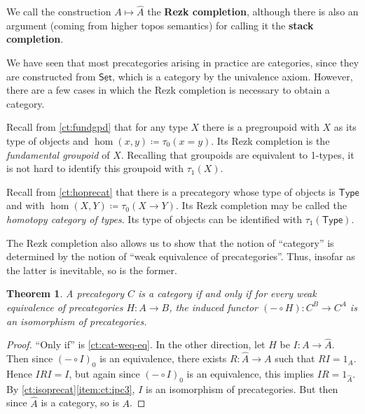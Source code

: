 \documentclass{amsart}
\newcommand{\defeq}{\coloneqq}  %
\newcommand{\type}{\ensuremath{\mathsf{Type}}\xspace}
\renewcommand{\set}{\ensuremath{\mathsf{Set}}\xspace}
\newcommand{\trunc}[2]{\tau_{#1}(#2)}
\def\pizero{\trunc0}
\newcommand{\uset}{\ensuremath{\underline{\set}}\xspace}
\newtheorem{thm}{Theorem}[section]
\theoremstyle{definition}
\theoremstyle{remark}
\numberwithin{equation}{section}
\begin{document}
We call the construction $A\mapsto \widehat A$ the \textbf{Rezk completion}, although there is also an argument (coming from higher topos semantics) for calling it the \textbf{stack completion}.

We have seen that most precategories arising in practice are categories, since they are constructed from \uset, which is a category by the univalence axiom.
However, there are a few cases in which the Rezk completion is necessary to obtain a category.

\begin{eg}
  Recall from \autoref{ct:fundgpd} that for any type $X$ there is a pregroupoid with $X$ as its type of objects and $\hom(x,y) \defeq \pizero{x=y}$.
  Its Rezk completion is the \emph{fundamental groupoid} of $X$.
  Recalling that groupoids are equivalent to 1-types, it is not hard to identify this groupoid with $\trunc1X$.
\end{eg}

\begin{eg}\label{ct:hocat}
  Recall from \autoref{ct:hoprecat} that there is a precategory whose type of objects is \type and with $\hom(X,Y) \defeq \pizero{X\to Y}$.
  Its Rezk completion may be called the \emph{homotopy category of types}.
  Its type of objects can be identified with $\trunc1\type$.
\end{eg}

The Rezk completion also allows us to show that the notion of ``category'' is determined by the notion of ``weak equivalence of precategories''.
Thus, insofar as the latter is inevitable, so is the former.

\begin{thm}
  A precategory $C$ is a category if and only if for every weak equivalence of precategories $H:A\to B$, the induced functor $(-\circ H):C^B \to C^A$ is an isomorphism of precategories.
\end{thm}
\begin{proof}
  ``Only if'' is \autoref{ct:cat-weq-eq}.
  In the other direction, let $H$ be $I:A\to\widehat A$.
  Then since $(-\circ I)_0$ is an equivalence, there exists $R:\widehat A\to A$ such that $RI=1_A$.
  Hence $IRI=I$, but again since $(-\circ I)_0$ is an equivalence, this implies $IR =1_{\widehat A}$.
  By \autoref{ct:isoprecat}\ref{item:ct:ipc3}, $I$ is an isomorphism of precategories.
  But then since $\widehat A$ is a category, so is $A$.
\end{proof}








\end{document}
